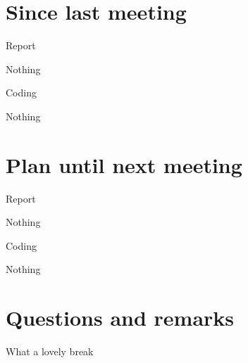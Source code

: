 \documentclass[a4paper,11pt,agenda,chair]{meetingmins}
\begin{document}
\maketitle

\section{Since last meeting}
\begin{items}
\item Report
	\begin{items}
		\item Nothing
	\end{items}
\item Coding
	\begin{items}
		\item Nothing
	\end{items}
\end{items}

\section{Plan until next meeting}
\begin{items}
\item Report
	\begin{items}
		\item Nothing
	\end{items}
\item Coding
	\begin{items}
		\item Nothing
	\end{items}
\end{items}

\section{Questions and remarks}
\begin{items}
	\item What a lovely break
\end{items}
\end{document}
